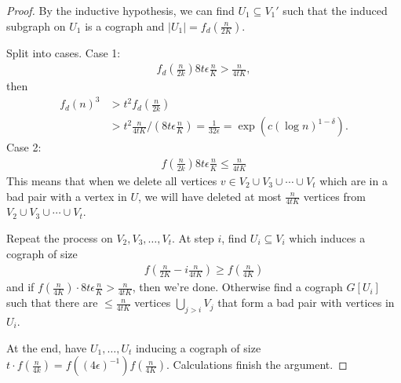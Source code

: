 \documentclass{article}
\begin{document}
\begin{proof}
  By the inductive hypothesis, we can find $U_1 \subseteq V_1'$ such that the induced subgraph on $U_1$ is a cograph and $|U_1| = f_d\left(\frac{n}{2K}\right)$.

  Split into cases.
  Case 1:
  \begin{align*}
    f_d(\frac{n}{2k}) 8 t \epsilon \frac{n}{K} > \frac{n}{4tK},
  \end{align*}
  then
  \begin{align*}
    f_d(n)^3 &> t^2 f_d\left(\frac{n}{2k}\right) \\
             &> t^2 \frac{n}{4tK} / (8t \epsilon \frac{n}{K}) = \frac{1}{32 \epsilon} = \exp(c (\log n)^{1-\delta}).
  \end{align*}
  Case 2:
  \begin{align*}
    f(\frac{n}{2k}) 8 t \epsilon \frac{n}{K} \leq \frac{n}{4tK}
  \end{align*}
  This means that when we delete all vertices $v \in V_2 \cup V_3 \cup \dotsb \cup V_t$ which are in a bad pair with a vertex in $U$, we will have deleted at most $\frac{n}{4tK}$ vertices from $V_2 \cup V_3 \cup \dotsb \cup V_t$.

  Repeat the process on $V_2, V_3, \dotsc, V_t$.
  At step $i$, find $U_i \subseteq V_i$ which induces a cograph of size
  \begin{align*}
    f\left(\frac{n}{2K} - i\frac{n}{4tK}\right) \geq f\left(\frac{n}{4K}\right)
  \end{align*}
  and if $f(\frac{n}{4K}) \cdot 8 t \epsilon \frac{n}{K} > \frac{n}{4tK}$, then we're done.
  Otherwise find a cograph $G[U_i]$ such that there are $\leq \frac{n}{4tK}$ vertices $\bigcup_{j > i} V_j$ that form a bad pair with vertices in $U_i$.

  At the end, have $U_1, \dotsc, U_t$ inducing a cograph of size $t \cdot f(\frac{n}{4k}) = f((4\epsilon)^{-1}) f(\frac{n}{4K})$.
  Calculations finish the argument.
\end{proof}
\end{document}
